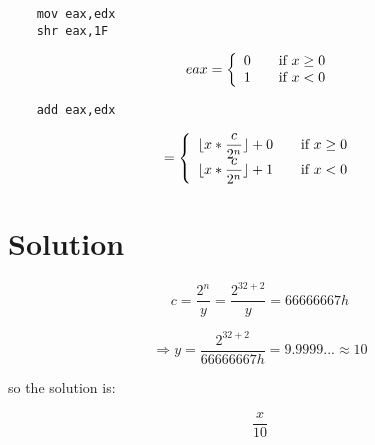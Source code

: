 \documentclass[fleqn]{article}
\DeclarePairedDelimiter\floor{\lfloor}{\rfloor}
\begin{document}
\begin{lstlisting}
    mov eax,edx
    shr eax,1F
\end{lstlisting}

\begin{equation*}
    eax = \left\{
        \begin{array}{l l}
            0 & \quad \text{if $x \ge 0$} \\
            1 & \quad \text{if $x < 0$}
        \end{array}
    \right.
\end{equation*}

\begin{lstlisting}
    add eax,edx
\end{lstlisting}

\begin{equation*}
    [\dfrac{x}{y}] = \left\{
        \begin{array}{l l}
            \floor{x * \dfrac{c}{2^{n}}} + 0 & \quad \text{if $x \ge 0$} \\
            \floor{x * \dfrac{c}{2^{n}}} + 1 & \quad \text{if $x < 0$}
        \end{array}
    \right.
\end{equation*}

\section{Solution}
\begin{equation*}
    c = \dfrac{2^{n}}{y} = \dfrac{2^{32 + 2}}{y} = 66666667h
\end{equation*}

\begin{equation*}
    \Rightarrow y = \dfrac{2^{32 + 2}}{66666667h} = 9.9999... \approx 10
\end{equation*}

so the solution is:

\begin{equation*}
    \dfrac{x}{10}
\end{equation*}
\end{document}
